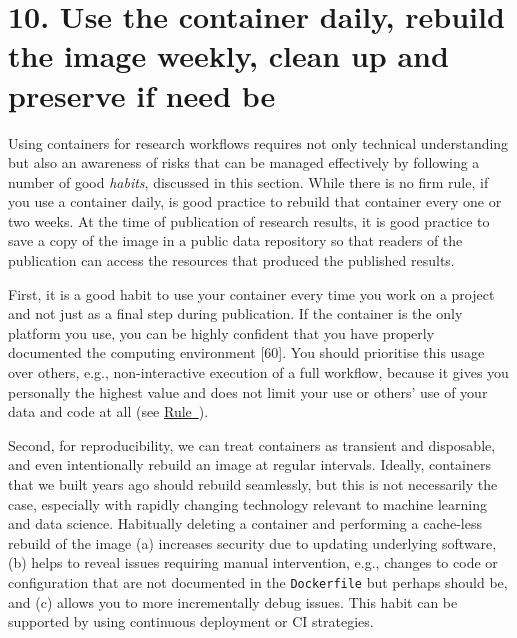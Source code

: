 \documentclass[10pt,letterpaper]{article}
\begin{document}
\hypertarget{use-the-container-daily-rebuild-the-image-weekly-clean-up-and-preserve-if-need-be}{%
\section*{10. Use the container daily, rebuild the image weekly, clean
up and preserve if need
be}\label{use-the-container-daily-rebuild-the-image-weekly-clean-up-and-preserve-if-need-be}}

  \label{rule:usage} 

Using containers for research workflows requires not only technical
understanding but also an awareness of risks that can be managed
effectively by following a number of good \emph{habits}, discussed in
this section. While there is no firm rule, if you use a container daily,
is good practice to rebuild that container every one or two weeks. At
the time of publication of research results, it is good practice to save
a copy of the image in a public data repository so that readers of the
publication can access the resources that produced the published
results.

First, it is a good habit to use your container every time you work on a
project and not just as a final step during publication. If the
container is the only platform you use, you can be highly confident that
you have properly documented the computing environment {[}60{]}. You
should prioritise this usage over others, e.g., non-interactive
execution of a full workflow, because it gives you personally the
highest value and does not limit your use or others' use of your data
and code at all (see
\hyperref[{rule:interactive}]{Rule~}).

Second, for reproducibility, we can treat containers as transient and
disposable, and even intentionally rebuild an image at regular
intervals. Ideally, containers that we built years ago should rebuild
seamlessly, but this is not necessarily the case, especially with
rapidly changing technology relevant to machine learning and data
science. Habitually deleting a container and performing a cache-less
rebuild of the image (a) increases security due to updating underlying
software, (b) helps to reveal issues requiring manual intervention,
e.g., changes to code or configuration that are not documented in the
\texttt{Dockerfile} but perhaps should be, and (c) allows you to more
incrementally debug issues. This habit can be supported by using
continuous deployment or CI strategies.
\end{document}
